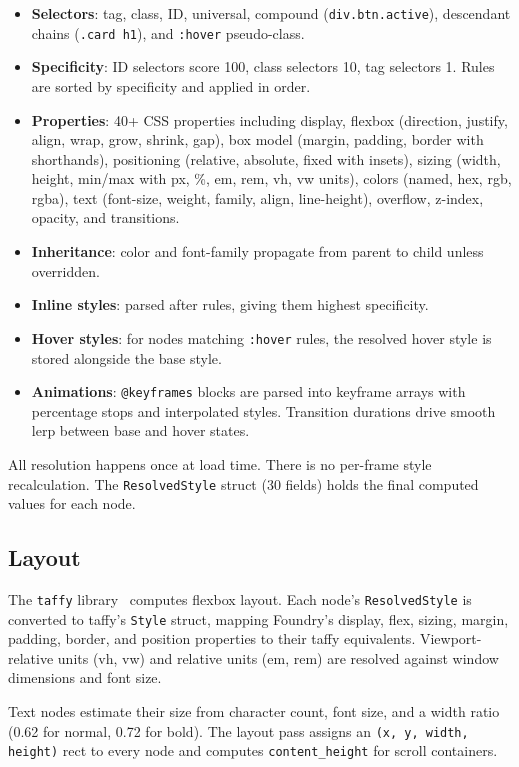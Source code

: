 \documentclass[11pt,twocolumn]{article}
\begin{document}
\begin{itemize}
\item \textbf{Selectors}: tag, class, ID, universal, compound (\texttt{div.btn.active}), descendant chains (\texttt{.card h1}), and \texttt{:hover} pseudo-class.
\item \textbf{Specificity}: ID selectors score 100, class selectors 10, tag selectors 1. Rules are sorted by specificity and applied in order.
\item \textbf{Properties}: 40+ CSS properties including display, flexbox (direction, justify, align, wrap, grow, shrink, gap), box model (margin, padding, border with shorthands), positioning (relative, absolute, fixed with insets), sizing (width, height, min/max with px, \%, em, rem, vh, vw units), colors (named, hex, rgb, rgba), text (font-size, weight, family, align, line-height), overflow, z-index, opacity, and transitions.
\item \textbf{Inheritance}: color and font-family propagate from parent to child unless overridden.
\item \textbf{Inline styles}: parsed after rules, giving them highest specificity.
\item \textbf{Hover styles}: for nodes matching \texttt{:hover} rules, the resolved hover style is stored alongside the base style.
\item \textbf{Animations}: \texttt{@keyframes} blocks are parsed into keyframe arrays with percentage stops and interpolated styles. Transition durations drive smooth lerp between base and hover states.
\end{itemize}

All resolution happens once at load time. There is no per-frame style recalculation. The \texttt{ResolvedStyle} struct (30 fields) holds the final computed values for each node.

\subsection{Layout}

The \texttt{taffy} library~\cite{taffy} computes flexbox layout. Each node's \texttt{ResolvedStyle} is converted to taffy's \texttt{Style} struct, mapping Foundry's display, flex, sizing, margin, padding, border, and position properties to their taffy equivalents. Viewport-relative units (vh, vw) and relative units (em, rem) are resolved against window dimensions and font size.

Text nodes estimate their size from character count, font size, and a width ratio (0.62 for normal, 0.72 for bold). The layout pass assigns an \texttt{(x, y, width, height)} rect to every node and computes \texttt{content\_height} for scroll containers.
\end{document}
